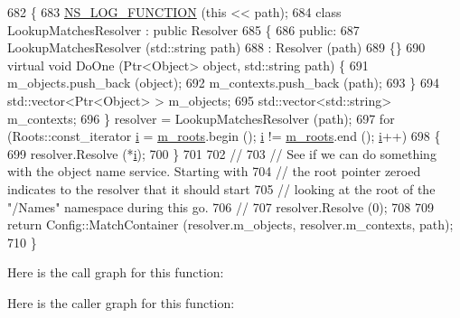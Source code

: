 \begin{DoxyCode}
682 \{
683   \hyperlink{log-macros-disabled_8h_a90b90d5bad1f39cb1b64923ea94c0761}{NS\_LOG\_FUNCTION} (\textcolor{keyword}{this} << path);
684   \textcolor{keyword}{class }LookupMatchesResolver : \textcolor{keyword}{public} Resolver 
685   \{
686   \textcolor{keyword}{public}:
687     LookupMatchesResolver (std::string path)
688       : Resolver (path)
689     \{\}
690     \textcolor{keyword}{virtual} \textcolor{keywordtype}{void} DoOne (Ptr<Object> \textcolor{keywordtype}{object}, std::string path) \{
691       m\_objects.push\_back (\textcolor{keywordtype}{object});
692       m\_contexts.push\_back (path);
693     \}
694     std::vector<Ptr<Object> > m\_objects;
695     std::vector<std::string> m\_contexts;
696   \} resolver = LookupMatchesResolver (path);
697   \textcolor{keywordflow}{for} (Roots::const\_iterator \hyperlink{bernuolliDistribution_8m_a6f6ccfcf58b31cb6412107d9d5281426}{i} = \hyperlink{classns3_1_1ConfigImpl_a54380ef7cb5b032793df59ecb3365dd3}{m\_roots}.begin (); \hyperlink{bernuolliDistribution_8m_a6f6ccfcf58b31cb6412107d9d5281426}{i} != \hyperlink{classns3_1_1ConfigImpl_a54380ef7cb5b032793df59ecb3365dd3}{m\_roots}.end (); 
      \hyperlink{bernuolliDistribution_8m_a6f6ccfcf58b31cb6412107d9d5281426}{i}++)
698     \{
699       resolver.Resolve (*\hyperlink{bernuolliDistribution_8m_a6f6ccfcf58b31cb6412107d9d5281426}{i});
700     \}
701 
702   \textcolor{comment}{//}
703   \textcolor{comment}{// See if we can do something with the object name service.  Starting with}
704   \textcolor{comment}{// the root pointer zeroed indicates to the resolver that it should start}
705   \textcolor{comment}{// looking at the root of the "/Names" namespace during this go.}
706   \textcolor{comment}{//}
707   resolver.Resolve (0);
708 
709   \textcolor{keywordflow}{return} Config::MatchContainer (resolver.m\_objects, resolver.m\_contexts, path);
710 \}
\end{DoxyCode}


Here is the call graph for this function\+:




Here is the caller graph for this function\+:


